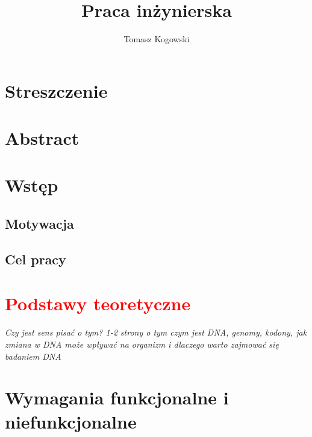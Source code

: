 \documentclass[a4paper,12pt,twoside]{article}
\title{Praca inżynierska}
\author{Tomasz Kogowski}
\begin{document}

\newpage 
\section*{Streszczenie}
\newpage 
\section*{Abstract}

\newpage

\newpage
\tableofcontents
 
\newpage
\section{Wstęp}  





\subsection{Motywacja}  
\newpage

\subsection{Cel pracy} 
\newpage
\section{\textcolor{red}{Podstawy teoretyczne}}  

\textit{Czy jest sens pisać o tym? 
1-2 strony o tym czym jest DNA, genomy, kodony, jak zmiana w DNA może wpływać na organizm i dlaczego warto zajmować się badaniem DNA}
\newpage
\section{Wymagania funkcjonalne i niefunkcjonalne}  
\end{document}
